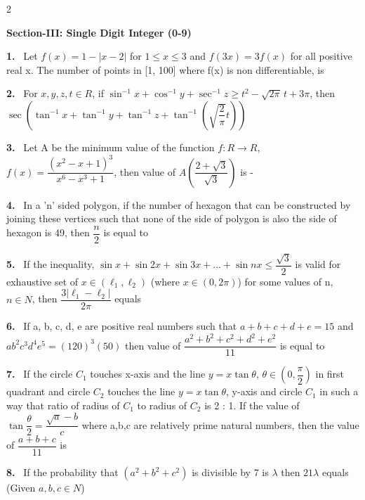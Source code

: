 \documentclass[10pt]{extarticle}
\newcommand{\sect}[1]{\par\smallskip\noindent\textbf{#1}\par}
\newcommand{\qn}[1]{\par\smallskip\noindent\textbf{#1.}~}
\begin{document}
\begin{multicols}{2}
\sect{Section-III: Single Digit Integer (0-9)}

\qn{1} Let $f(x)=1-|x-2|$ for $1\le x\le3$ and $f(3x)=3f(x)$ for all positive real x. The number of points in [1, 100] where f(x) is non differentiable, is

\qn{2} For $x,y,z,t\in R$, if $\sin^{-1}x+\cos^{-1}y+\sec^{-1}z\ge t^2-\sqrt{2\pi}\,t+3\pi$, then $\sec\left(\tan^{-1}x+\tan^{-1}y+\tan^{-1}z+\tan^{-1}\left(\sqrt{\dfrac2\pi}t\right)\right)$

\qn{3} Let A be the minimum value of the function $f:R\to R$, $f(x)=\dfrac{(x^2-x+1)^3}{x^6-x^3+1}$, then value of $A\left(\dfrac{2+\sqrt3}{\sqrt3}\right)$ is -

\qn{4} In a 'n' sided polygon, if the number of hexagon that can be constructed by joining these vertices such that none of the side of polygon is also the side of hexagon is 49, then $\dfrac{n}{2}$ is equal to

\qn{5} If the inequality, $\sin x+\sin2x+\sin3x+\ldots+\sin nx\le\dfrac{\sqrt3}{2}$ is valid for exhaustive set of $x\in(\ell_1,\ell_2)$ (where $x\in(0,2\pi)$) for some values of n, $n\in N$, then $\dfrac{3|\ell_1-\ell_2|}{2\pi}$ equals

\qn{6} If a, b, c, d, e are positive real numbers such that $a+b+c+d+e=15$ and $ab^2c^3d^4e^5=(120)^3(50)$ then value of $\dfrac{a^2+b^2+c^2+d^2+e^2}{11}$ is equal to

\qn{7} If the circle $C_1$ touches x-axis and the line $y=x\tan\theta$, $\theta\in\left(0,\dfrac{\pi}{2}\right)$ in first quadrant and circle $C_2$ touches the line $y=x\tan\theta$, y-axis and circle $C_1$ in such a way that ratio of radius of $C_1$ to radius of $C_2$ is 2 : 1. If the value of $\tan\dfrac{\theta}{2}=\dfrac{\sqrt a-b}{c}$ where a,b,c are relatively prime natural numbers, then the value of $\dfrac{a+b+c}{11}$ is

\qn{8} If the probability that $(a^2+b^2+c^2)$ is divisible by 7 is $\lambda$ then $21\lambda$ equals (Given $a,b,c\in N$)

\end{multicols}
\end{document}
